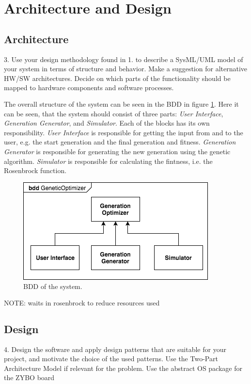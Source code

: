 \section{Architecture and Design}\label{sec:archdesign}

\subsection{Architecture}
\begin{framed}
3. Use your design methodology found in 1. to describe a SysML/UML model of your system in terms of structure and behavior. Make a suggestion for alternative HW/SW architectures. Decide on which parts of the functionality should be mapped to hardware components and software processes.
\end{framed}

The overall structure of the system can be seen in the BDD in figure \ref{fig:bdd}. Here it can be seen, that the system should consist of three parts: \emph{User Interface}, \emph{Generation Generator}, and \emph{Simulator}. Each of the blocks has its own responsibility. \emph{User Interface} is responsible for getting the input from and to the user, e.g. the start generation and the final generation and fitness. \emph{Generation Generator} is responsible for generating the new generation using the genetic algorithm. \emph{Simulator} is responsible for calculating the fintness, i.e. the Rosenbrock function.

\begin{figure}[htbp]
\begin{centering}
\includegraphics[width=0.7\linewidth]{../diagrams/bdd.png}
\caption{BDD of the system.}
\label{fig:bdd}
\end{centering}
\end{figure}





NOTE: waits in rosenbrock to reduce resources used


\subsection{Design}

\begin{framed}
4. Design the software and apply design patterns that are suitable for your project, and motivate the choice of the used patterns. Use the Two-Part Architecture Model if relevant for the problem. Use the abstract OS package for the ZYBO board
\end{framed}